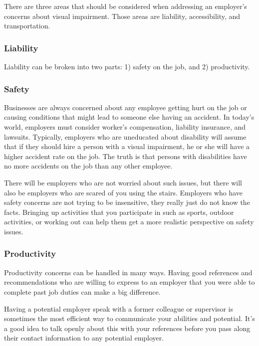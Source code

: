 There are three areas that should be considered when addressing an employer's concerns about visual impairment. Those areas are liability, accessibility, and transportation.

\subsubsection*{Liability}

Liability can be broken into two parts: 1) safety on the job, and 2) productivity.

\subsubsection*{Safety}

Businesses are always concerned about any employee getting hurt on the job or causing conditions that might lead to someone else having an accident. In today's world, employers must consider worker's compensation, liability insurance, and lawsuits. Typically, employers who are uneducated about disability will assume that if they should hire a person with a visual impairment, he or she will have a higher accident rate on the job. The truth is that persons with disabilities have no more accidents on the job than any other employee.

There will be employers who are not worried about such issues, but there will also be employers who are scared of you using the stairs. Employers who have safety concerns are not trying to be insensitive, they really just do not know the facts. Bringing up activities that you participate in such as sports, outdoor activities, or working out can help them get a more realistic perspective on safety issues.

\subsubsection*{Productivity}

Productivity concerns can be handled in many ways. Having good references and recommendations who are willing to express to an employer that you were able to complete past job duties can make a big difference.

Having a potential employer speak with a former colleague or supervisor is sometimes the most efficient way to communicate your abilities and potential. It's a good idea to talk openly about this with your references before you pass along their contact information to any potential employer.


